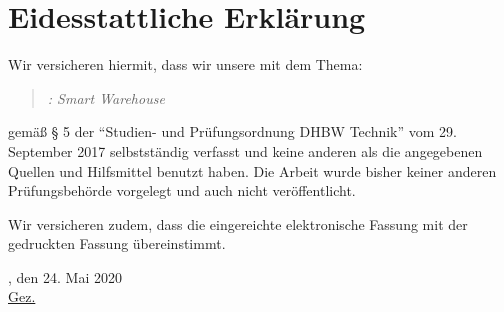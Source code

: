\chapter*{Eidesstattliche Erklärung}
Wir versicheren hiermit, dass wir unsere \arbeit{} mit dem Thema:
\begin{quote}
	\textit{\titel: Smart Warehouse}
\end{quote} 
gemäß § 5 der \enquote{Studien- und Prüfungsordnung DHBW Technik} vom 29. September 2017 selbstständig verfasst und keine anderen als die angegebenen Quellen und Hilfsmittel benutzt haben. Die Arbeit wurde bisher keiner anderen Prüfungsbehörde vorgelegt und auch nicht veröffentlicht.

\vspace{0.25cm}

Wir versicheren zudem, dass die eingereichte elektronische Fassung mit der gedruckten Fassung übereinstimmt.

\vspace{1cm}

\verfassungsort, den 24. Mai 2020 \\[0.5cm]
	{\underline{Gez. \autor}}
	{\makebox[6cm]{\hrulefill}}\\ 
\autorReverse
